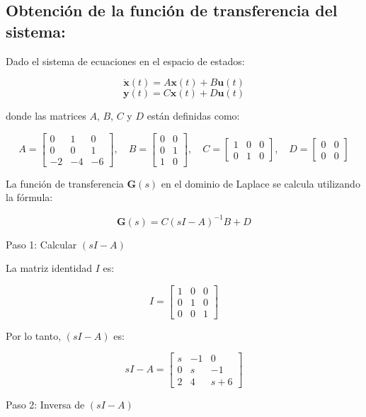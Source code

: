 \documentclass[10pt]{article}
\theoremstyle{definition}
\theoremstyle{remark}
\theoremstyle{definition}
\numberwithin{equation}{prob}
\begin{document}
\subsection{Obtención de la función de transferencia del sistema:}

Dado el sistema de ecuaciones en el espacio de estados:

\[
	\dot{\mathbf{x}}(t) = A\mathbf{x}(t) + B\mathbf{u}(t)
\]
\[
	\mathbf{y}(t) = C\mathbf{x}(t) + D\mathbf{u}(t)
\]

donde las matrices \( A \), \( B \), \( C \) y \( D \) están definidas como:

\[
	A = \begin{bmatrix}
		0  & 1  & 0  \\
		0  & 0  & 1  \\
		-2 & -4 & -6
	\end{bmatrix}, \quad
	B = \begin{bmatrix}
		0 & 0 \\
		0 & 1 \\
		1 & 0
	\end{bmatrix}, \quad
	C = \begin{bmatrix}
		1 & 0 & 0 \\
		0 & 1 & 0
	\end{bmatrix}, \quad
	D = \begin{bmatrix}
		0 & 0 \\
		0 & 0
	\end{bmatrix}
\]

La función de transferencia \( \mathbf{G}(s) \) en el dominio de Laplace se calcula utilizando la fórmula:

\[
	\mathbf{G}(s) = C(sI - A)^{-1}B + D
\]

Paso 1: Calcular \( (sI - A) \)

La matriz identidad \( I \) es:

\[
	I = \begin{bmatrix}
		1 & 0 & 0 \\
		0 & 1 & 0 \\
		0 & 0 & 1
	\end{bmatrix}
\]

Por lo tanto, \( (sI - A) \) es:

\[
	sI - A = \begin{bmatrix}
		s & -1 & 0     \\
		0 & s  & -1    \\
		2 & 4  & s + 6
	\end{bmatrix}
\]

Paso 2: Inversa de \( (sI - A) \)
\end{document}
